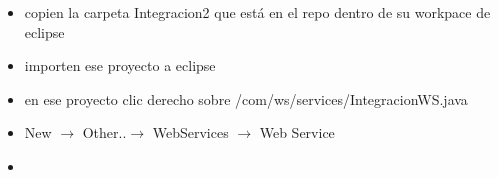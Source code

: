 \documentclass[12pt]{article}
\begin{document}
\begin{itemize}
\begin{itemize}
\begin{minipage}[t]{\linewidth}
          \medskip
          As\'i se ve el m\'io
    \end{minipage}
\item Crear un proyecto "dummy" para que eclipse se entere de que tiene axis2: \ \newline
\begin{itemize}
\item File $\rightarrow$ New.. $\rightarrow$ Dynamic Web Proyect
\item Project name: \textbf{"LoQueSea"} 
\item Dynamic web module version: \textbf{2.5} 
\item Configuration $\rightarrow$ Modify.. $\rightarrow$ tildar \emph{Axis2 Web Services} 
\item Ok $\rightarrow$ Finish
\end{itemize}
\item Detener (si existe y est\'a corriendo por fuera del eclipse) el Tomcat, en linux se usa esto:
\begin{verbatim}
sudo /etc/init.d/tomcat7 stop
\end{verbatim}
\item Buscar dentro de \emph{eclipse} el proyecto \textsc{Servers} y abrirlo.
\end{itemize}
\item copien la carpeta Integracion2 que est\'a en el repo dentro de su workpace de eclipse
\item importen ese proyecto a eclipse
\item en ese proyecto clic derecho sobre /com/ws/services/IntegracionWS.java
\item New $\rightarrow$  Other..$\rightarrow$ WebServices $\rightarrow$ Web Service
\item  \begin{minipage}[t]{\linewidth}
          \raggedright


\end{minipage}
\end{itemize}
\end{document}
